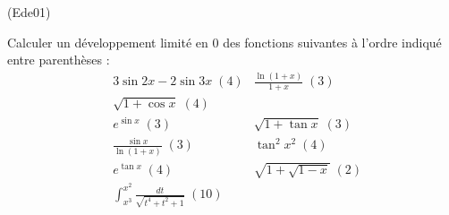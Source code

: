 \begin{tiny}(Ede01)\end{tiny}
Calculer un développement limité en $0$ des fonctions suivantes {\`a} l'ordre indiqu{\'e} entre parenth{\`e}ses :
\begin{align*}
& 3\sin 2x-2\sin 3x\;  (4) 
&\frac{\ln (1+x)}{1+x}\; (3) \\
&\sqrt{1+\cos x}\; (4) \\
&e^{\sin x}\; (3) 
&\sqrt{1+\tan x}\; (3) \\
&\frac{\sin x}{\ln (1+x)}\; (3) 
&\tan^{2}x^{2}\; (4)\\
&e^{\tan x}\; (4)
&\sqrt{1+\sqrt{1-x}}\; (2) \\
&\int_{x^3}^{x^2}\frac{dt}{\sqrt{t^4 + t^2 + 1}}\; (10)
\end{align*}
